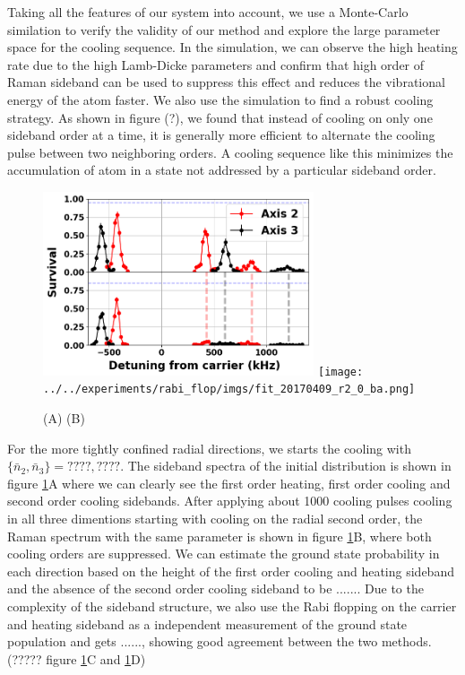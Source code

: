 \documentclass[aps,prl,twocolumn,groupedaddress]{revtex4-1}
\begin{document}

Taking all the features of our system into account, we use a Monte-Carlo similation to verify
the validity of our method and explore the large parameter space for the cooling sequence.
In the simulation, we can observe the high heating rate due to the high Lamb-Dicke parameters
and confirm that high order of Raman sideband can be used to suppress this effect and reduces
the vibrational energy of the atom faster.
We also use the simulation to find a robust cooling strategy. As shown in figure (?),
we found that instead of cooling on only one sideband order at a time, it is generally more
efficient to alternate the cooling pulse between two neighboring orders. A cooling sequence
like this minimizes the accumulation of atom in a state not addressed by a particular sideband order.\\

\begin{figure}
  \includegraphics[width=8cm]{imgs/spectrum_r.png}
  \texttt{[image: ../../experiments/rabi\_flop/imgs/fit\_20170409\_r2\_0\_ba.png]}
  \caption{(A) (B) \label{f-radial}}
\end{figure}

For the more tightly confined radial directions, we starts the cooling with $\{\bar n_2, \bar n_3\}=????, ????$. The sideband spectra of the initial distribution is shown in figure \ref{f-radial}A where we can clearly see the first order heating, first order cooling and second order cooling sidebands. After applying about 1000 cooling pulses cooling in all three dimentions starting with cooling on the radial second order, the Raman spectrum with the same parameter is shown in figure \ref{f-radial}B, where both cooling orders are suppressed. We can estimate the ground state probability in each direction based on the height of the first order cooling and heating sideband and the absence of the second order cooling sideband to be $......$. Due to the complexity of the sideband structure, we also use the Rabi flopping on the carrier and heating sideband as a independent measurement of the ground state population and gets $......$, showing good agreement between the two methods. (????? figure \ref{f-radial}C and \ref{f-radial}D)\\
\end{document}
